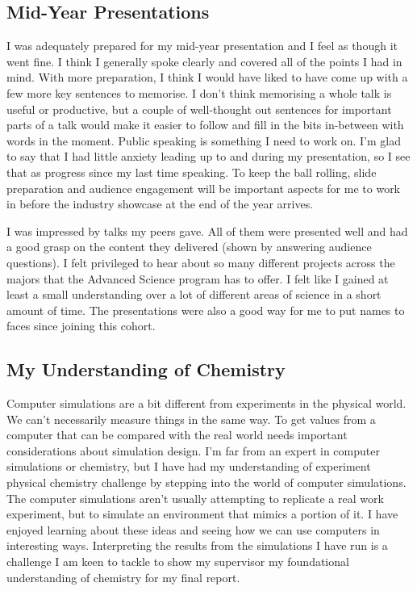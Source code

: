 \documentclass[11pt]{article}
\begin{document}
\subsection{Mid-Year Presentations}

I was adequately prepared for my mid-year presentation and I feel as though it went fine. I think I generally spoke clearly and covered all of the points I had in mind. With more preparation, I think I would have liked to have come up with a few more key sentences to memorise. I don't think memorising a whole talk is useful or productive, but a couple of well-thought out sentences for important parts of a talk would make it easier to follow and fill in the bits in-between with words in the moment. Public speaking is something I need to work on. I'm glad to say that I had little anxiety leading up to and during my presentation, so I see that as progress since my last time speaking. To keep the ball rolling, slide preparation and audience engagement will be important aspects for me to work in before the industry showcase at the end of the year arrives.

I was impressed by talks my peers gave. All of them were presented well and had a good grasp on the content they delivered (shown by answering audience questions). I felt privileged to hear about so many different projects across the majors that the Advanced Science program has to offer. I felt like I gained at least a small understanding over a lot of different areas of science in a short amount of time. The presentations were also a good way for me to put names to faces since joining this cohort.

\subsection{My Understanding of Chemistry}

Computer simulations are a bit different from experiments in the physical world. We can't necessarily measure things in the same way. To get values from a computer that can be compared with the real world needs important considerations about simulation design. I'm far from an expert in computer simulations or chemistry, but I have had my understanding of experiment physical chemistry challenge by stepping into the world of computer simulations. The computer simulations aren't usually attempting to replicate a real work experiment, but to simulate an environment that mimics a portion of it. I have enjoyed learning about these ideas and seeing how we can use computers in interesting ways. Interpreting the results from the simulations I have run is a challenge I am keen to tackle to show my supervisor my foundational understanding of chemistry for my final report.
\end{document}
